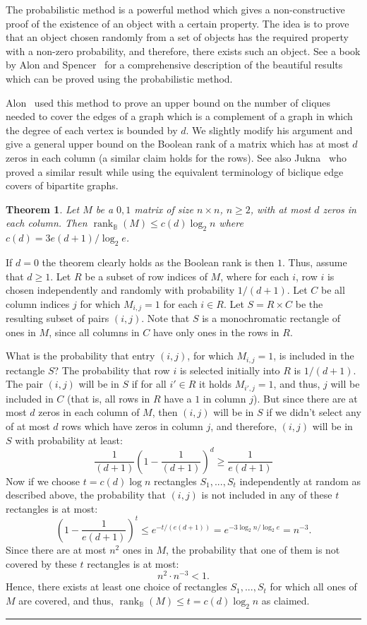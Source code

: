 \documentclass[11pt]{article}
\newtheorem{theorem}{Theorem}
\newcommand{\qedsymb}{\hfill{\rule{2mm}{2mm}}}
\renewenvironment{proof}[1][]{\begin{trivlist}
\item[\hspace{\labelsep}{\bf\noindent Proof#1:\/}] }{\qedsymb\end{trivlist}}
\newcommand{\rank}{\mathop{\mathrm{rank}}}
\newcommand{\Rbool}{{\rank}_\mathbb{B}}
\begin{document}
The probabilistic method is a powerful method which gives a non-constructive proof of the existence of an object with a certain property.
The idea is to prove that an object chosen randomly from a set of objects has the required property with a non-zero probability, and therefore, there exists such an object.
See a book by Alon and Spencer~\cite{alon2016probabilistic} for a comprehensive description of the beautiful results which can be proved using the probabilistic method.

Alon~\cite{alon1986covering} used this method to prove an upper bound on the number of cliques needed to cover the edges of a graph
which is a complement of a graph in which the degree of each vertex is bounded by $d$.
We slightly modify his argument and give a general upper bound on the Boolean rank of a matrix which has at most $d$ zeros in each column
(a similar claim holds for the rows).
See also Jukna~\cite{jukna2009set} who proved a similar result  while using the equivalent terminology of biclique edge covers of bipartite graphs.


\begin{theorem}
\label{theo:Alon}
Let $M$ be a $0,1$ matrix of size $n \times n$, $n \geq 2$, with at most $d$ zeros in each column. Then $\Rbool(M) \leq c(d) \log_2 n$ where $c(d) =  3e(d+1)/\log_2 e $.
\end{theorem}
\begin{proof}
If $d = 0$ the theorem clearly holds as the Boolean rank is then $1$. Thus, assume that $d \geq 1$.
Let $R$ be a subset of row indices of $M$, where for each $i$, row $i$ is chosen independently and randomly with probability $1/(d+1)$.
Let $C$ be all column indices $j$ for which $M_{i,j} = 1$ for each $i \in R$.
Let $S  = R \times C$  be the resulting subset of pairs $(i,j)$.
Note that $S$ is a monochromatic rectangle of ones in $M$, since all columns in $C$ have only ones in the rows in $R$.

What is the probability that entry $(i,j)$, for which $M_{i,j} = 1$, is included in the rectangle $S$?
The probability that row $i$ is selected initially into $R$  is $1/(d+1)$.
The pair $(i,j)$ will be in $S$ if for all $i'\in R$ it holds $M_{i',j} = 1$, and thus, $j$ will be included in $C$ (that is, all rows in $R$ have a $1$ in column $j$).
But since there are at most $d$ zeros in each column of $M$, then $(i,j)$ will be in $S$ if we didn't select any of at most $d$ rows which have zeros in column $j$,
and therefore, $(i,j)$ will be in $S$ with probability at least:
$$
\frac{1}{(d+1)}\left( 1 - \frac{1}{(d+1)}\right)^{d} \geq \frac{1}{e (d+1)}
$$
Now if we choose $t = c(d)\log n $ rectangles $S_1,...,S_{t}$ independently at random as described above,
the probability that $(i,j)$ is not included in any of these $t$ rectangles is at most:
$$
\left(1- \frac{1}{e(d+1)} \right)^t \leq e^{-t/(e(d+1))} = e^{-3\log_2 n/\log_2 e } = n^{-3}.
$$
Since there are at most $n^2$ ones in $M$, the probability that one of them is not covered by these $t$ rectangles is at most:
$$n^2 \cdot n^{-3} < 1.$$
Hence, there exists at least one choice of rectangles $S_1,...,S_t$ for which all ones of $M$ are covered, and thus, $\Rbool(M) \leq t = c(d)\log_2 n$ as claimed.
\end{proof}
\end{document}
